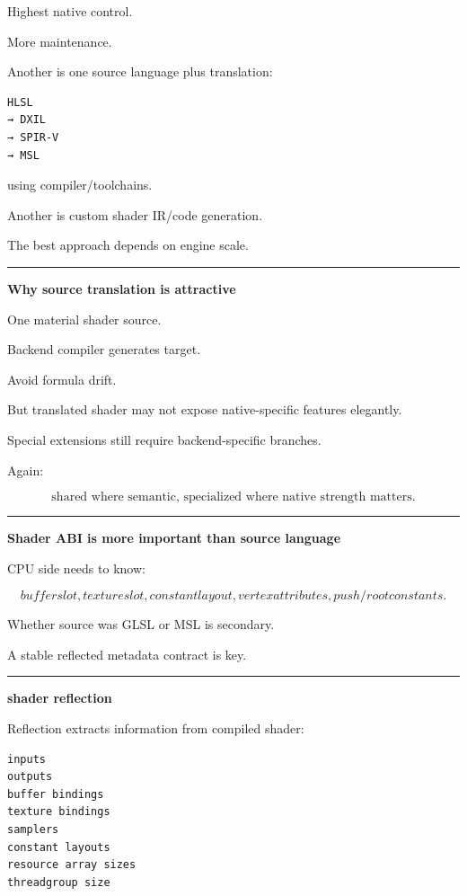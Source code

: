 Highest native control.

More maintenance.

Another is one source language plus translation:

\begin{verbatim}
HLSL
→ DXIL
→ SPIR-V
→ MSL
\end{verbatim}

using compiler/toolchains.

Another is custom shader IR/code generation.

The best approach depends on engine scale.

\begin{center}\rule{0.5\linewidth}{0.5pt}\end{center}

\textbf{Why source translation is attractive}

One material shader source.

Backend compiler generates target.

Avoid formula drift.

But translated shader may not expose native-specific features elegantly.

Special extensions still require backend-specific branches.

Again:

\[
\boxed{
\text{shared where semantic, specialized where native strength matters}.
}
\]

\begin{center}\rule{0.5\linewidth}{0.5pt}\end{center}

\textbf{Shader ABI is more important than source language}

CPU side needs to know:

\[
buffer slot,
texture slot,
constant layout,
vertex attributes,
push/root constants.
\]

Whether source was GLSL or MSL is secondary.

A stable reflected metadata contract is key.

\begin{center}\rule{0.5\linewidth}{0.5pt}\end{center}

\textbf{shader reflection}

Reflection extracts information from compiled shader:

\begin{verbatim}
inputs
outputs
buffer bindings
texture bindings
samplers
constant layouts
resource array sizes
threadgroup size
\end{verbatim}

